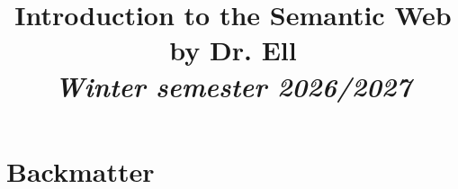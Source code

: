 
\usepackage[ngerman]{babel}







\title{Introduction to the Semantic Web \\ \small{by Dr. Ell} \\ \textit{\footnotesize{Winter semester 2026/2027} } }

\newcommand\reporttitle{Lecture Introduction to the Semantic Web}
\newcommand\reportsubtitle{Winter semester 2026/2027}
\newcommand\profs{Vorlesung von Dr. Ell}
\newcommand\reportsubsubtitle{Vorlesungsnotizen und Aufarbeitung}
\newcommand\reportauthors{
    \textbf{Liliana Sanfilippo}
}


    \frontmatter
    
    {\hypersetup{linkcolor=black} %
    \tableofcontents\thispagestyle{empty}}
    \newpage

    \mainmatter





    \backmatter


    \chapter{Backmatter}\label{ch:backmatter}

    \listoffigures

    \printindex

    \printglossary[type=defi, title=Definitions]



